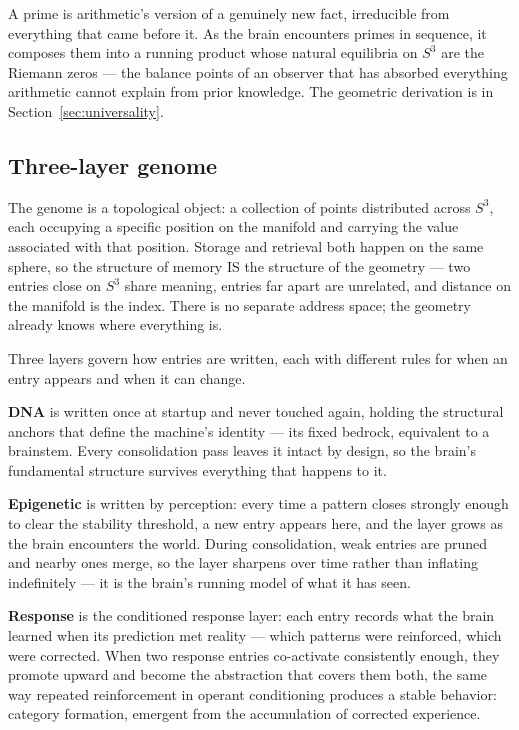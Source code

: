 \documentclass[12pt,a4paper]{article}
\theoremstyle{definition}
\theoremstyle{remark}
\begin{document}
A prime is arithmetic's version of a genuinely new fact, irreducible from
everything that came before it. As the brain encounters primes in sequence,
it composes them into a running product whose natural equilibria on $S^3$
are the Riemann zeros --- the balance points of an observer that has absorbed
everything arithmetic cannot explain from prior knowledge. The geometric
derivation is in Section~\ref{sec:universality}.

\subsection{Three-layer genome}

The genome is a topological object: a collection of points distributed across
$S^3$, each occupying a specific position on the manifold and carrying the
value associated with that position. Storage and retrieval both happen on the
same sphere, so the structure of memory IS the structure of the geometry ---
two entries close on $S^3$ share meaning, entries far apart are unrelated,
and distance on the manifold is the index. There is no separate address space;
the geometry already knows where everything is.

Three layers govern how entries are written, each with different rules for
when an entry appears and when it can change.

\textbf{DNA} is written once at startup and never touched again, holding the
structural anchors that define the machine's identity --- its fixed bedrock,
equivalent to a brainstem. Every consolidation pass leaves it intact by
design, so the brain's fundamental structure survives everything that
happens to it.

\textbf{Epigenetic} is written by perception: every time a pattern closes
strongly enough to clear the stability threshold, a new entry appears here,
and the layer grows as the brain encounters the world. During consolidation,
weak entries are pruned and nearby ones merge, so the layer sharpens over
time rather than inflating indefinitely --- it is the brain's running model
of what it has seen.

\textbf{Response} is the conditioned response layer: each entry records what
the brain learned when its prediction met reality --- which patterns were
reinforced, which were corrected. When two response entries co-activate
consistently enough, they promote upward and become the abstraction that
covers them both, the same way repeated reinforcement in operant conditioning
produces a stable behavior: category formation, emergent from the accumulation
of corrected experience.
\end{document}
